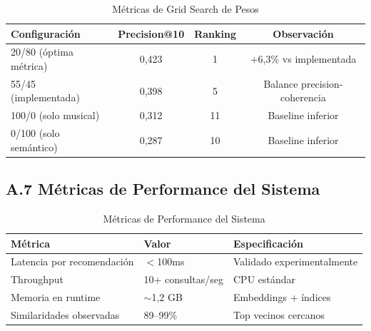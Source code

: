 \begin{table}[htbp]
\centering
\caption{Métricas de Grid Search de Pesos}
\label{tab:metricas-gridsearch}
\begin{tabular}{lccc}
\toprule
\textbf{Configuración} & \textbf{Precision@10} & \textbf{Ranking} & \textbf{Observación} \\
\midrule
20/80 (óptima métrica) & 0,423 & 1 & +6,3\% vs implementada \\
55/45 (implementada) & 0,398 & 5 & Balance precision-coherencia \\
100/0 (solo musical) & 0,312 & 11 & Baseline inferior \\
0/100 (solo semántico) & 0,287 & 10 & Baseline inferior \\
\bottomrule
\end{tabular}
\end{table}

\subsection*{A.7 Métricas de Performance del Sistema}

\begin{table}[htbp]
\centering
\caption{Métricas de Performance del Sistema}
\label{tab:metricas-performance}
\begin{tabular}{lll}
\toprule
\textbf{Métrica} & \textbf{Valor} & \textbf{Especificación} \\
\midrule
Latencia por recomendación & $<$100ms & Validado experimentalmente \\
Throughput & 10+ consultas/seg & CPU estándar \\
Memoria en runtime & $\sim$1,2 GB & Embeddings + índices \\
Similaridades observadas & 89--99\% & Top vecinos cercanos \\
\bottomrule
\end{tabular}
\end{table}
